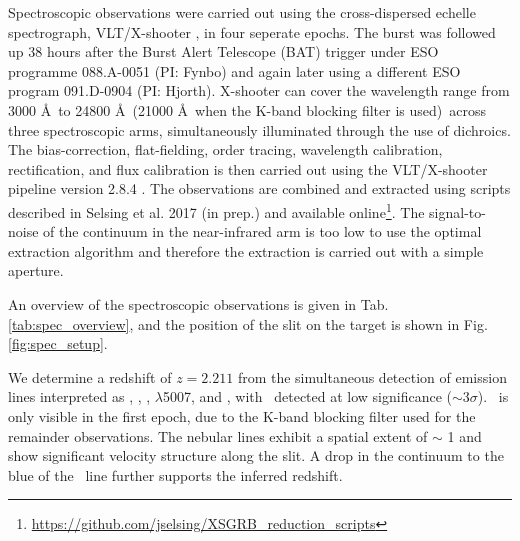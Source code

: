 \documentclass{aa}    %
\begin{document}
Spectroscopic observations were carried out using the cross-dispersed echelle
spectrograph, VLT/X-shooter \citep{Vernet2011}, in four seperate epochs. The
burst was followed up 38 hours after the Burst Alert Telescope (BAT) trigger
under ESO programme 088.A-0051 (PI: Fynbo) and again later using a different ESO
program 091.D-0904 (PI: Hjorth). X-shooter can cover the wavelength range from
3000 \AA~to 24800 \AA~(21000 \AA~when the K-band blocking filter is used)~across
three spectroscopic arms, simultaneously illuminated through the use of
dichroics. The bias-correction, flat-fielding, order tracing, wavelength
calibration, rectification, and flux calibration is then carried out using the
VLT/X-shooter pipeline version 2.8.4 \citep{Modigliani2010}. 
The observations are combined and extracted using scripts described in Selsing
et al. 2017 (in prep.) and available
online\footnote{\url{https://github.com/jselsing/XSGRB_reduction_scripts}}. The
signal-to-noise of the continuum in the near-infrared arm is too low to use the
optimal extraction algorithm \citep{Horne1986} and therefore the extraction is
carried out with a simple aperture.

An overview of the spectroscopic observations is given in Tab. \ref{tab:spec_overview}, and the position of the slit on the target is shown in Fig. \ref{fig:spec_setup}.


We determine a redshift of $z = 2.211$ from the simultaneous detection of
emission lines interpreted as \lya, \oii, \hb, \oiii$\lambda$5007, and \ha, with
\hb~detected at low significance ($\sim 3 \sigma$). \ha~is only visible in the
first epoch, due to the K-band blocking filter used for the remainder
observations. The nebular lines exhibit a spatial extent of $\sim$ 1 and
show significant velocity structure along the slit. A drop in the continuum to
the blue of the \lya~line further supports the inferred redshift.
\end{document}

